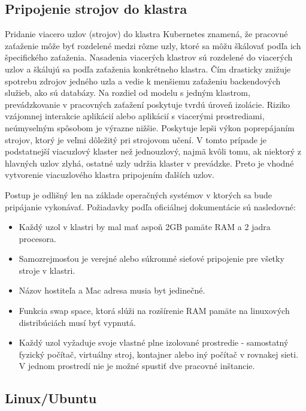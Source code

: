\subsection{Pripojenie strojov do klastra}

Pridanie viacero uzlov (strojov) do klastra Kubernetes znamená, že pracovné zaťaženie môže byť rozdelené medzi rôzne uzly, ktoré sa môžu škálovať podľa ich špecifického zaťaženia. Nasadenia viacerých klastrov sú rozdelené do viacerých uzlov a škálujú sa podľa zaťaženia konkrétneho klastra. Čím drasticky znižuje spotrebu zdrojov jedného uzla a vedie k menšiemu zaťaženiu backendových služieb, ako sú databázy. Na rozdiel od modelu s jedným klastrom, prevádzkovanie v pracovných zaťažení poskytuje tvrdú úroveň izolácie. Riziko vzájomnej interakcie aplikácií alebo aplikácií s viacerými prostrediami, neúmyselným spôsobom je výrazne nižšie. Poskytuje lepši výkon poprepájaním strojov, ktorý je veľmi dôležitý pri strojovom učení. V tomto prípade je podstatnejší viacuzlový klaster než jednouzlový, najmä kvôli tomu, ak niektorý z hlavných uzlov zlyhá, ostatné uzly udržia klaster v prevádzke. Preto je vhodné vytvorenie viacuzlového klastra pripojením ďalších uzlov.

Postup je odlišný len na základe operačných systémov v ktorých sa bude pripájanie vykonávať. Požiadavky podľa oficiálnej dokumentácie sú nasledovné:

\begin{itemize}
    \item Každý uzol v klastri by mal mať aspoň 2GB pamäte RAM a 2 jadra procesora.
    \item Samozrejmosťou je verejné alebo súkromné sieťové pripojenie pre všetky stroje v klastri.
    \item Názov hostiteľa a Mac adresa musia byt jedinečné.
    \item Funkcia swap space, ktorá slúži na rozšírenie RAM pamäte na linuxových distribúciách musí byť vypnutá.
    \item Každý uzol vyžaduje svoje vlastné plne izolované prostredie - samostatný fyzický počítač, virtuálny stroj, kontajner alebo iný počítač v rovnakej sieti. V jednom prostredí nie je možné spustiť dve pracovné inštancie.
\end{itemize}

\subsection*{Linux/Ubuntu}

